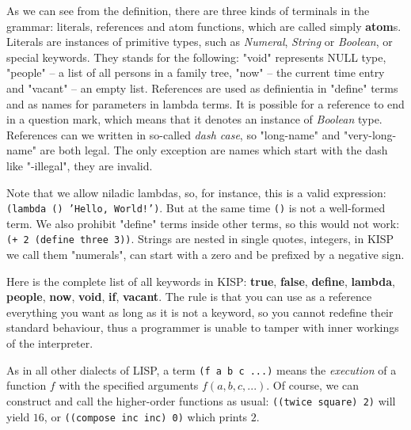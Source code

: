     As we can see from the definition, there are three kinds of terminals in the grammar: literals, references and atom functions,
    which are called simply \textbf{atom}s. Literals are instances of primitive types, such as \textit{Numeral}, \textit{String} or
    \textit{Boolean}, or special keywords. They stands for the following: "void" represents NULL type, "people" -- a list of
    all persons in a family tree, "now" -- the current time entry and "vacant" -- an empty list. References are used as definientia in
    "define" terms and as names for parameters in lambda terms. It is possible for a reference to end in a question mark, which means
    that it denotes an instance of \textit{Boolean} type. References can we written in so-called \textit{dash case}, so "long-name"
    and "very-long-name" are both legal. The only exception are names which start with the dash like "-illegal", they are invalid.

    Note that we allow niladic lambdas, so, for instance, this is a valid expression: \texttt{(lambda () 'Hello, World!')}. But at the
    same time \texttt{()} is not a well-formed term. We also prohibit "define" terms inside other terms, so this would not work:
    \texttt{(+ 2 (define three 3))}. Strings are nested in single quotes, integers, in KISP we call them "numerals", can start with a
    zero and be prefixed by a negative sign.

    Here is the complete list of all keywords in KISP: \textbf{true}, \textbf{false}, \textbf{define}, \textbf{lambda},
    \textbf{people}, \textbf{now}, \textbf{void}, \textbf{if}, \textbf{vacant}. The rule is that you can use as a reference everything
    you want as long as it is not a keyword, so you cannot redefine their standard behaviour, thus a programmer is unable to tamper
    with inner workings of the interpreter.

    As in all other dialects of LISP, a term \texttt{(f a b c ...)} means the \textit{execution} of a function $f$ with the
    specified arguments $f(a, b, c, ...)$. Of course, we can construct and call the higher-order functions as usual:
    \texttt{((twice square) 2)} will yield $16$, or \texttt{((compose inc inc) 0)} which prints $2$.

